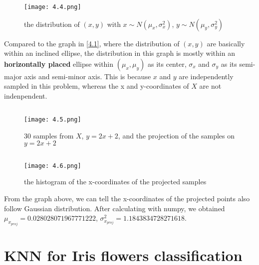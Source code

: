 \documentclass{article}
\begin{document}
        \begin{figure}[hbt!]
            \centering
            \caption{the distribution of $(x,y)$ with $x\sim N(\mu_x,\sigma_x^2)$, $y\sim N(\mu_y,\sigma_y^2)$}
            \texttt{[image: 4.4.png]}
        \end{figure}

        \noindent Compared to the graph in \ref{4.1}, where the distribution of $(x, y)$ are basically within an inclined ellipse,
        the distribution in this graph is mostly within an \textbf{horizontally placed} ellipse within $(\mu_x,\mu_y)$ as its center,
        $\sigma_x$ and $\sigma_y$ as its semi-major axis and semi-minor axis. This is because $x$ and $y$ are independently sampled in this problem,
        whereas the x and y-coordinates of $X$ are not indenpendent.
    
    \subsection{}\label{4.5}

        \begin{figure}[hbt!]
            \centering
            \caption{30 samples from $X$, $y=2x+2$, and the projection of the samples on $y=2x+2$}
            \texttt{[image: 4.5.png]}
        \end{figure}

    \subsection{}\label{4.6}
        
        \begin{figure}[hbt!]
            \centering
            \caption{the histogram of the x-coordinates of the projected samples}
            \texttt{[image: 4.6.png]}
        \end{figure}
        
        \noindent From the graph above, we can tell the x-coordinates of the projected points also follow Gaussian distribution.
        After calculating with numpy, we obtained $\mu_{x_{proj}}=0.028028071967771222$, $\sigma_{x_{proj}}^2=1.1843834728271618$.
        
    \section{KNN for Iris flowers classification}
\end{document}
